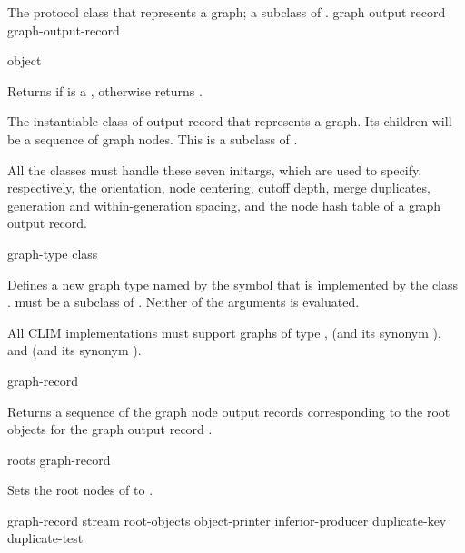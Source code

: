 
The protocol class that represents a graph; a subclass of .
 {graph output record} {graph-output-record}

 {object}

Returns  if  is a , otherwise
returns .


The instantiable class of output record that represents a graph.  Its children
will be a sequence of graph nodes.  This is a subclass of .


All the  classes must handle these seven initargs, which are used to
specify, respectively, the orientation, node centering, cutoff depth, merge
duplicates, generation and within-generation spacing, and the node hash table of
a graph output record.


 {graph-type class}

Defines a new graph type named by the symbol  that is
implemented by the class .   must be a subclass of
.  Neither of the arguments is evaluated.

All CLIM implementations must support graphs of type ,
 (and its synonym ), and
 (and its synonym ).


 {graph-record}

Returns a sequence of the graph node output records corresponding to the root
objects for the graph output record .

 {roots graph-record}

Sets the root nodes of  to .


 {graph-record stream
                                    root-objects object-printer inferior-producer 
                                    \key duplicate-key duplicate-test}

